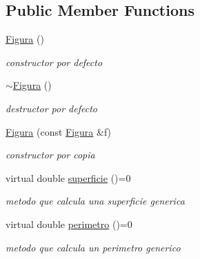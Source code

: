 \subsection*{Public Member Functions}
\begin{DoxyCompactItemize}
\item 
\mbox{\label{class_figura_a6977c7f0438c11b985a9a74c208b51c8}} 
\hyperlink{class_figura_a6977c7f0438c11b985a9a74c208b51c8}{Figura} ()
\begin{DoxyCompactList}\small\item\em constructor por defecto \end{DoxyCompactList}\item 
\mbox{\label{class_figura_a6130eb548893c36efcb7933e2da6821e}} 
\hyperlink{class_figura_a6130eb548893c36efcb7933e2da6821e}{$\sim$\+Figura} ()
\begin{DoxyCompactList}\small\item\em destructor por defecto \end{DoxyCompactList}\item 
\mbox{\label{class_figura_a2f55faa2fd40a5ebb2c5d1c958927f2a}} 
\hyperlink{class_figura_a2f55faa2fd40a5ebb2c5d1c958927f2a}{Figura} (const \hyperlink{class_figura}{Figura} \&f)
\begin{DoxyCompactList}\small\item\em constructor por copia \end{DoxyCompactList}\item 
\mbox{\label{class_figura_aaaff1d3f33df845278d20b5eab009fca}} 
virtual double \hyperlink{class_figura_aaaff1d3f33df845278d20b5eab009fca}{superficie} ()=0
\begin{DoxyCompactList}\small\item\em metodo que calcula una superficie generica \end{DoxyCompactList}\item 
\mbox{\label{class_figura_ad41d892aad534c23be85b96671c09d78}} 
virtual double \hyperlink{class_figura_ad41d892aad534c23be85b96671c09d78}{perimetro} ()=0
\begin{DoxyCompactList}\small\item\em metodo que calcula un perimetro generico \end{DoxyCompactList}\item 

\end{DoxyCompactItemize}
